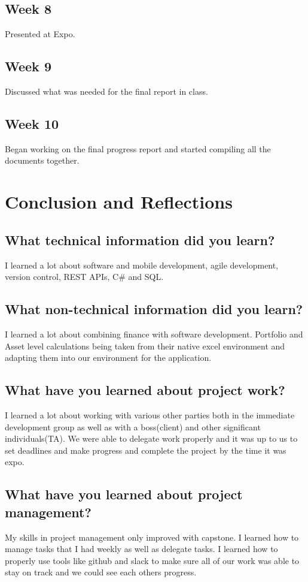 \documentclass[onecolumn, draftclsnofoot,10pt, compsoc]{IEEEtran}
\begin{document}
    \subsection{Week 8} 
    Presented at Expo. 
    
    \subsection{Week 9}
    Discussed what was needed for the final report in class.
    
    \subsection{Week 10} 
    Began working on the final progress report and started compiling all the documents together. 
    
    
\section{Conclusion and Reflections} 
    \subsection{What technical information did you learn?} 
    I learned a lot about software and mobile development, agile development, version control, REST APIs, C# and SQL.

    
    \subsection{What non-technical information did you learn?} 
    I learned a lot about combining finance with software development. Portfolio and Asset level calculations being taken from their native excel environment and adapting them into our environment for the application.

    
    \subsection{What have you learned about project work?} 
    I learned a lot about working with various other parties both in the immediate development group as well as with a boss(client) and other significant individuals(TA). We were able to delegate work properly and it was up to us to set deadlines and make progress and complete the project by the time it was expo. 
    
    \subsection{What have you learned about project management?} 
    My skills in project management only improved with capstone. I learned how to manage tasks that I had weekly as well as delegate tasks. I learned how to properly use tools like github and slack  to make sure all of our work was able to stay on track and we could see each others progress.
    
\end{document}
